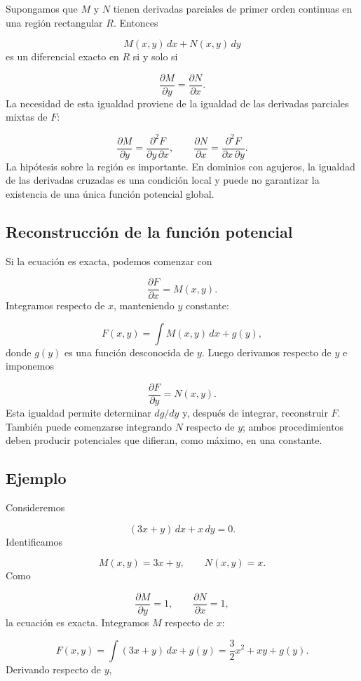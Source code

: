 \documentclass[12pt,a4paper]{article}
\begin{document}
	Supongamos que \(M\) y \(N\) tienen derivadas parciales de primer orden continuas en una región rectangular \(R\). Entonces

	\[
	M(x,y)\,dx+N(x,y)\,dy
	\]
	es un diferencial exacto en \(R\) si y solo si

	\[
	\boxed{
	\frac{\partial M}{\partial y}
	=
	\frac{\partial N}{\partial x}.
	}
	\]
	La necesidad de esta igualdad proviene de la igualdad de las derivadas parciales mixtas de \(F\):

	\[
	\frac{\partial M}{\partial y}
	=
	\frac{\partial^2F}{\partial y\,\partial x},
	\qquad
	\frac{\partial N}{\partial x}
	=
	\frac{\partial^2F}{\partial x\,\partial y}.
	\]
	La hipótesis sobre la región es importante. En dominios con agujeros, la igualdad de las derivadas cruzadas es una condición local y puede no garantizar la existencia de una única función potencial global.

	\subsection{Reconstrucción de la función potencial}

	Si la ecuación es exacta, podemos comenzar con

	\[
	\frac{\partial F}{\partial x}=M(x,y).
	\]
	Integramos respecto de \(x\), manteniendo \(y\) constante:

	\[
	F(x,y)=\int M(x,y)\,dx+g(y),
	\]
	donde \(g(y)\) es una función desconocida de \(y\). Luego derivamos respecto de \(y\) e imponemos

	\[
	\frac{\partial F}{\partial y}=N(x,y).
	\]
	Esta igualdad permite determinar \(dg/dy\) y, después de integrar, reconstruir \(F\). También puede comenzarse integrando \(N\) respecto de \(y\); ambos procedimientos deben producir potenciales que difieran, como máximo, en una constante.

	\subsection{Ejemplo}

	Consideremos

	\[
	(3x+y)\,dx+x\,dy=0.
	\]
	Identificamos

	\[
	M(x,y)=3x+y,
	\qquad
	N(x,y)=x.
	\]
	Como

	\[
	\frac{\partial M}{\partial y}=1,
	\qquad
	\frac{\partial N}{\partial x}=1,
	\]
	la ecuación es exacta. Integramos \(M\) respecto de \(x\):

	\[
	F(x,y)
	=
	\int(3x+y)\,dx+g(y)
	=
	\frac32x^2+xy+g(y).
	\]
	Derivando respecto de \(y\),
\end{document}
